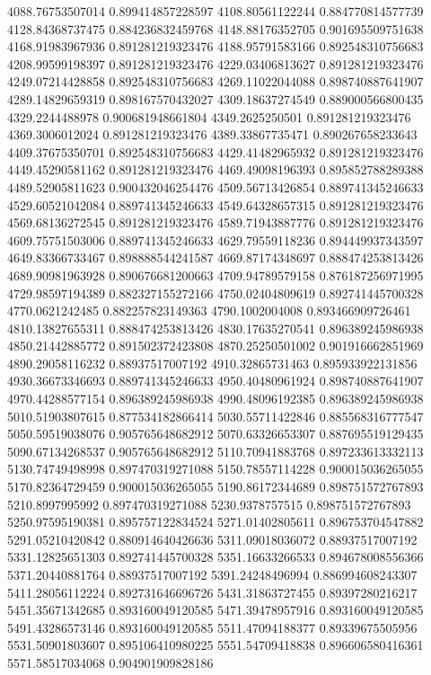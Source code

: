 {4088.76753507014 0.899414857228597
4108.80561122244 0.884770814577739
4128.84368737475 0.884236832459768
4148.88176352705 0.901695509751638
4168.91983967936 0.891281219323476
4188.95791583166 0.892548310756683
4208.99599198397 0.891281219323476
4229.03406813627 0.891281219323476
4249.07214428858 0.892548310756683
4269.11022044088 0.898740887641907
4289.14829659319 0.898167570432027
4309.18637274549 0.889000566800435
4329.2244488978 0.900681948661804
4349.2625250501 0.891281219323476
4369.3006012024 0.891281219323476
4389.33867735471 0.890267658233643
4409.37675350701 0.892548310756683
4429.41482965932 0.891281219323476
4449.45290581162 0.891281219323476
4469.49098196393 0.895852788289388
4489.52905811623 0.900432046254476
4509.56713426854 0.889741345246633
4529.60521042084 0.889741345246633
4549.64328657315 0.891281219323476
4569.68136272545 0.891281219323476
4589.71943887776 0.891281219323476
4609.75751503006 0.889741345246633
4629.79559118236 0.894449937343597
4649.83366733467 0.898888544241587
4669.87174348697 0.888474253813426
4689.90981963928 0.890676681200663
4709.94789579158 0.876187256971995
4729.98597194389 0.882327155272166
4750.02404809619 0.892741445700328
4770.0621242485 0.882257823149363
4790.1002004008 0.893466909726461
4810.13827655311 0.888474253813426
4830.17635270541 0.896389245986938
4850.21442885772 0.891502372423808
4870.25250501002 0.901916662851969
4890.29058116232 0.88937517007192
4910.32865731463 0.895933922131856
4930.36673346693 0.889741345246633
4950.40480961924 0.898740887641907
4970.44288577154 0.896389245986938
4990.48096192385 0.896389245986938
5010.51903807615 0.877534182866414
5030.55711422846 0.885568316777547
5050.59519038076 0.905765648682912
5070.63326653307 0.887695519129435
5090.67134268537 0.905765648682912
5110.70941883768 0.897233613332113
5130.74749498998 0.897470319271088
5150.78557114228 0.900015036265055
5170.82364729459 0.900015036265055
5190.86172344689 0.898751572767893
5210.8997995992 0.897470319271088
5230.9378757515 0.898751572767893
5250.97595190381 0.895757122834524
5271.01402805611 0.896753704547882
5291.05210420842 0.880914640426636
5311.09018036072 0.88937517007192
5331.12825651303 0.892741445700328
5351.16633266533 0.894678008556366
5371.20440881764 0.88937517007192
5391.24248496994 0.886994608243307
5411.28056112224 0.892731646696726
5431.31863727455 0.89397280216217
5451.35671342685 0.893160049120585
5471.39478957916 0.893160049120585
5491.43286573146 0.893160049120585
5511.47094188377 0.89339675505956
5531.50901803607 0.895106410980225
5551.54709418838 0.896606580416361
5571.58517034068 0.904901909828186
}
